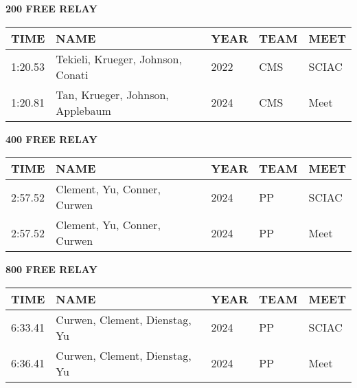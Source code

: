 \vspace{0.4cm}

\begin{center}
\begin{minipage}[t]{0.7\textwidth}
\centering
\textbf{200 FREE RELAY}\\[0.05cm]
\begin{tabular}{@{}p{1.8cm}p{2.8cm}p{1.2cm}p{1.4cm}p{1.4cm}@{}}
\hline
\textbf{TIME} & \textbf{NAME} & \textbf{YEAR} & \textbf{TEAM} & \textbf{MEET} \\
\hline
1:20.53 & Tekieli, Krueger, Johnson, Conati & 2022 & CMS & SCIAC \\
1:20.81 & Tan, Krueger, Johnson, Applebaum & 2024 & CMS & Meet \\
\hline
\end{tabular}
\end{minipage}
\end{center}

\vspace{0.4cm}

\begin{center}
\begin{minipage}[t]{0.7\textwidth}
\centering
\textbf{400 FREE RELAY}\\[0.05cm]
\begin{tabular}{@{}p{1.8cm}p{2.8cm}p{1.2cm}p{1.4cm}p{1.4cm}@{}}
\hline
\textbf{TIME} & \textbf{NAME} & \textbf{YEAR} & \textbf{TEAM} & \textbf{MEET} \\
\hline
2:57.52 & Clement, Yu, Conner, Curwen & 2024 & PP & SCIAC \\
2:57.52 & Clement, Yu, Conner, Curwen & 2024 & PP & Meet \\
\hline
\end{tabular}
\end{minipage}
\end{center}

\vspace{0.4cm}

\begin{center}
\begin{minipage}[t]{0.7\textwidth}
\centering
\textbf{800 FREE RELAY}\\[0.05cm]
\begin{tabular}{@{}p{1.8cm}p{2.8cm}p{1.2cm}p{1.4cm}p{1.4cm}@{}}
\hline
\textbf{TIME} & \textbf{NAME} & \textbf{YEAR} & \textbf{TEAM} & \textbf{MEET} \\
\hline
6:33.41 & Curwen, Clement, Dienstag, Yu & 2024 & PP & SCIAC \\
6:36.41 & Curwen, Clement, Dienstag, Yu & 2024 & PP & Meet \\
\hline
\end{tabular}
\end{minipage}
\end{center}

